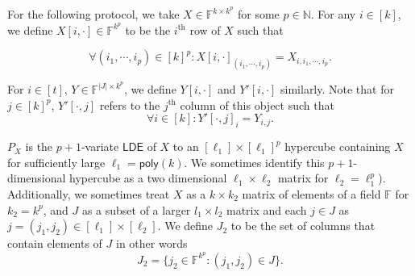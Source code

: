 \documentclass[10pt,a4paper]{article}
\newcommand{\poly}{\mathsf{poly}}
\newcommand{\LDE}{\mathsf{LDE}}
\newcommand{\F}{\mathbb{F}}
\newcommand{\N}{\mathbb{N}}
\begin{document}
For the following protocol, we take $X\in \F^{k\times k^{p}}$ for some $p\in \N$. For any $i\in [k]$, we define $X[i,\cdot]\in \F^{k^{p}}$ to be the $i^{\text{th}}$ row of $X$ such that 

\begin{equation*}
    \forall (i_{1},\cdots, i_{p})\in [k]^{p}:X[i,\cdot]_{(i_{1},\cdots, i_{p})}=X_{i,i_{1},\cdots, i_{p}}. 
\end{equation*}

For $i\in [t]$, $Y\in \F^{|J|\times k^{p}}$, we define $Y[i,\cdot]$ and $Y'[i,\cdot]$ similarly. Note that for $j\in [k]^{p}$, $Y'[\cdot,j]$ refers to the $j^{\text{th}}$ column of this object such that 
\begin{equation*}
    \forall i\in [k]:Y'[\cdot,j]_{i}=Y_{i,j}. 
\end{equation*}

$P_{X}$ is the $p+1$-variate $\LDE$ of $X$ to an $[\ell_{1}]\times [\ell_{1}]^{p}$ hypercube containing $X$ for sufficiently large $\ell_{1}=\poly(k)$. We sometimes identify this $p+1$-dimensional hypercube as a two dimensional $\ell_{1}\times \ell_{2}$ matrix for $\ell_{2}=\ell_{1}^{p}$). Additionally, we sometimes treat $X$ as a $k \times k_{2}$ matrix of elements of a field $\mathbb{F}$ for $k_{2}=k^{p}$, and $J$ as a subset of a larger $l_{1}\times l_{2}$ matrix and each $j \in J$ as $j = (j_{1}, j_{2}) \in [\ell_{1}] \times [\ell_{2}]$. We define $J_{2}$ to be the set of columns that contain elements of $J$ in other words
\begin{equation*}
    J_{2}= \{j_{2}\in \F^{k^{p}} : (j_{1}, j_{2}) \in J\}.
\end{equation*} 
\end{document}
